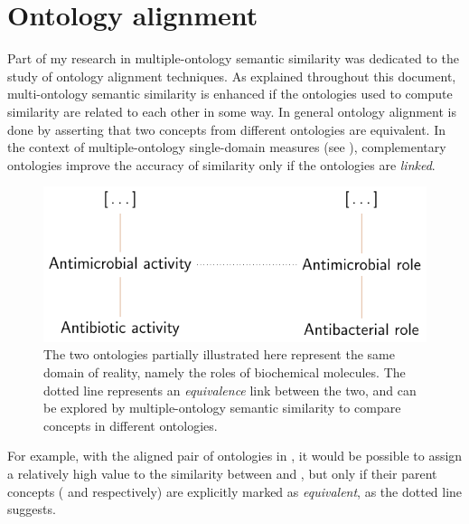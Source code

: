 \section{Ontology alignment} \label{sec:auxiliary-projects/alignment}

Part of my research in multiple-ontology semantic similarity was dedicated to the study of ontology alignment techniques. As explained throughout this document, multi-ontology semantic similarity is enhanced if the ontologies used to compute similarity are related to each other in some way. In general ontology alignment is done by asserting that two concepts from different ontologies are equivalent. In the context of multiple-ontology single-domain measures (see ), complementary ontologies improve the accuracy of similarity only if the ontologies are \emph{linked}.

\begin{figure}
    \centering
    \includegraphics{images/alignment.pdf}
    \caption[Partial alignment between two ontologies of the biochemical domain]{The two ontologies partially illustrated here represent the same domain of reality, namely the roles of biochemical molecules. The dotted line represents an \emph{equivalence} link between the two, and can be explored by multiple-ontology semantic similarity to compare concepts in different ontologies.}
    \label{fig:simple-match}
\end{figure}

For example, with the aligned pair of ontologies in , it would be possible to assign a relatively high value to the similarity between  and , but only if their parent concepts ( and  respectively) are explicitly marked as \emph{equivalent}, as the dotted line suggests.

